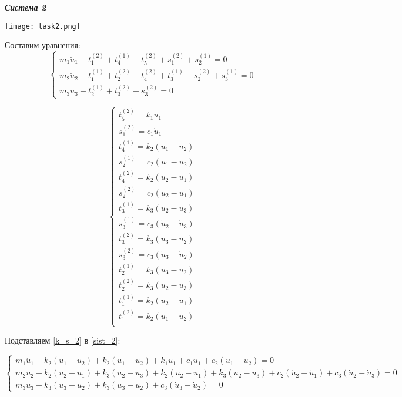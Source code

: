 \documentclass[a4paper, 12pt]{article}
\begin{document}
\newpage
\begin{center}
\textbf{\textit{Система 2}}
\end{center}

\texttt{[image: task2.png]}

Составим уравнения:
\begin{equation} \label{sist_2} 
\begin{cases}
m_1\ddot u_1 + t_1^{(2)} + t_4^{(1)} + t_5^{(2)} + s_1^{(2)} + s_2^{(1)} = 0\\
m_2\ddot u_2 + t_1^{(1)} + t_2^{(2)}+ t_4^{(2)} + t_3^{(1)}  + s_2^{(2)} + s_3^{(1)} = 0\\
m_3\ddot u_3 + t_2^{(1)} + t_3^{(2)} + s_3^{(2)} = 0 
\end{cases}
\end{equation}

\begin{equation} \label{k_s_2} 
\begin{cases}
t_5^{(2)} = k_1 u_1\\
s_1^{(2)} = c_1 \dot u_1\\
t_4^{(1)} = k_2 (u_1 - u_2)\\
s_2^{(1)} = c_2 (\dot u_1 - \dot u_2)\\
t_4^{(2)} = k_2 (u_2 - u_1)\\
s_2^{(2)} = c_2 (\dot u_2 - \dot u_1)\\
t_3^{(1)} = k_3 (u_2 - u_3)\\
s_3^{(1)} = c_3 (\dot u_2 - \dot u_3)\\
t_3^{(2)} = k_3 (u_3 - u_2)\\
s_3^{(2)} = c_3 (\dot u_3 - \dot u_2)\\
t_2^{(1)} = k_3 (u_3 - u_2)\\
t_2^{(2)} = k_3 (u_2 - u_3)\\
t_1^{(1)} = k_2 (u_2 - u_1)\\
t_1^{(2)} = k_2 (u_1 - u_2)\\
\end{cases}
\end{equation}

Подставляем \eqref{k_s_2} в \eqref{sist_2}:

\[
\begin{cases}
m_1\ddot u_1 + k_2 (u_1 - u_2) + k_2 (u_1 - u_2) + k_1 u_1 + c_1 \dot u_1 + c_2 (\dot u_1 - \dot u_2) = 0\\
m_2\ddot u_2 + k_2 (u_2 - u_1) + k_3 (u_2 - u_3) + k_2 (u_2 - u_1) + k_3 (u_2 - u_3)  + c_2 (\dot u_2 - \dot u_1) + c_3 (\dot u_2 - \dot u_3) = 0\\
m_3\ddot u_3 + k_3 (u_3 - u_2) + k_3 (u_3 - u_2) + c_3 (\dot u_3 - \dot u_2) = 0 
\end{cases}
\]
\end{document}
